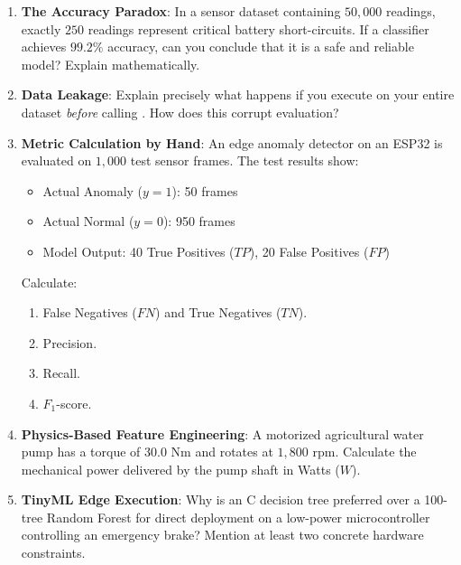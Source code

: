 \begin{enumerate}
    \item \textbf{The Accuracy Paradox}: In a sensor dataset containing $50{,}000$ readings, exactly $250$ readings represent critical battery short-circuits. If a classifier achieves $99.2\%$ accuracy, can you conclude that it is a safe and reliable model? Explain mathematically.
    
    \item \textbf{Data Leakage}: Explain precisely what happens if you execute  on your entire dataset \textit{before} calling . How does this corrupt evaluation?
    
    \item \textbf{Metric Calculation by Hand}: An edge anomaly detector on an ESP32 is evaluated on $1{,}000$ test sensor frames. The test results show:
    \begin{itemize}
        \item Actual Anomaly ($y=1$): 50 frames
        \item Actual Normal ($y=0$): 950 frames
        \item Model Output: 40 True Positives ($TP$), 20 False Positives ($FP$)
    \end{itemize}
    Calculate:
    \begin{enumerate}[label=(\alph*)]
        \item False Negatives ($FN$) and True Negatives ($TN$).
        \item Precision.
        \item Recall.
        \item $F_1$-score.
    \end{enumerate}

    \item \textbf{Physics-Based Feature Engineering}: A motorized agricultural water pump has a torque of $30.0\text{ Nm}$ and rotates at $1{,}800\text{ rpm}$. Calculate the mechanical power delivered by the pump shaft in Watts ($W$).

    \item \textbf{TinyML Edge Execution}: Why is an  C decision tree preferred over a 100-tree Random Forest for direct deployment on a low-power microcontroller controlling an emergency brake? Mention at least two concrete hardware constraints.
\end{enumerate}

